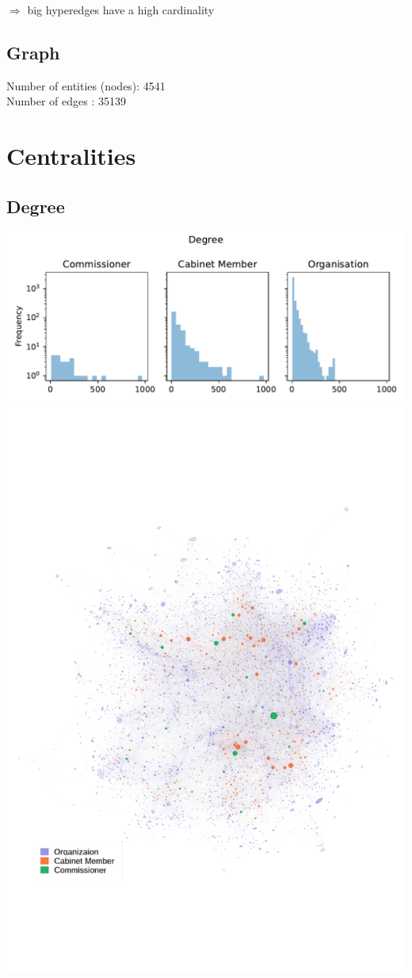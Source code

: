 \documentclass[ 11pt]{article}
\begin{document}
     $\Rightarrow$  big hyperedges have a high cardinality
     
\subsection{Graph}
Number of entities (nodes): 4541\\
Number of edges : 35139 \\


\section{Centralities}
\subsection{Degree}
\includegraphics[scale=0.6]{../Programs/Figures/Degree.pdf}\\
\includegraphics[scale=0.5]{../Programs/Figures/Degree.png} 
\end{document}
